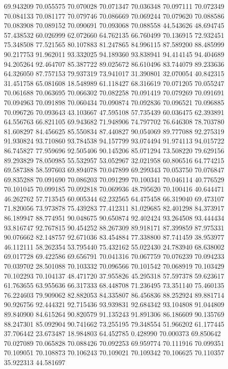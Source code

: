 69.943209
70.055575
70.070028
70.071347
70.036348
70.097111
70.072349
70.084133
70.081177
70.079746
70.086669
70.069244
70.079620
70.088586
70.083908
70.089152
70.090691
70.093068
70.088558
44.543626
48.694745
57.438532
60.026999
62.072660
64.762135
66.760499
70.136915
72.932451
75.348508
77.521565
80.107883
81.247865
84.996115
87.589200
88.485999
90.217753
91.962011
93.332025
94.189360
93.838941
94.414145
94.404689
94.205264
92.464707
85.387722
89.025672
86.610496
83.744079
89.233636
64.326050
87.757153
79.937319
73.941017
31.390801
32.070054
40.842315
31.451758
65.081608
18.548989
61.118427
68.316619
70.071205
70.055247
70.061688
70.063695
70.066302
70.082258
70.091419
70.079269
70.091691
70.094963
70.091898
70.060434
70.090874
70.092836
70.096521
70.096885
70.096726
70.093643
43.103667
47.595108
57.735439
60.036475
62.393891
64.556763
66.821105
69.943682
71.948906
74.797702
76.646308
78.703780
81.608297
84.456625
85.550834
87.440827
90.054069
89.777088
92.275319
91.930824
93.710860
93.784538
94.157799
93.074494
91.974113
94.015722
86.745827
77.959696
92.505406
90.145206
85.071294
73.508220
79.629156
89.293829
78.050985
55.532957
53.052967
32.021958
60.806516
64.774215
69.587388
58.597603
69.894078
70.047899
69.299343
70.053750
70.076847
69.835288
70.091690
70.086203
70.091299
70.100341
70.046114
40.776529
70.101045
70.099185
70.092818
70.069936
48.795620
70.100416
40.644471
46.262762
57.713545
60.005344
62.232565
64.475458
66.319040
69.473107
71.820056
73.973878
75.439283
77.412311
81.029685
82.401298
84.373917
86.189947
88.774951
90.048675
90.650874
92.402424
93.264508
93.444434
93.816747
92.767815
90.454252
88.267309
89.918171
87.399859
87.975331
90.076662
82.148757
92.671036
83.454884
77.338800
87.741459
38.953977
46.112111
58.262354
53.795440
75.432162
55.022430
24.783940
68.638002
69.017728
69.422586
69.656791
70.041316
70.067759
70.076239
70.094233
70.039702
28.501088
70.103332
70.096566
70.101542
70.068919
70.103429
70.102293
70.104137
48.471720
37.955826
45.295318
57.597378
59.623617
61.763655
63.955636
66.317333
68.448708
71.236495
73.351140
75.460135
76.224603
79.909062
82.882053
84.335807
86.456836
88.252924
89.881714
90.926756
92.444321
92.715436
93.939831
92.684342
93.104808
91.044809
89.840900
84.615264
90.820579
91.135243
91.891306
86.186609
90.135769
88.247301
85.092904
90.741662
73.255195
79.348554
51.966202
61.177445
37.706442
23.673487
18.984803
64.452785
0.428990
70.000373
69.850642
70.027089
70.065828
70.088426
70.092253
69.959774
70.111916
70.099351
70.109051
70.108873
70.106243
70.109021
70.109342
70.106625
70.110357
35.922313
44.581697
